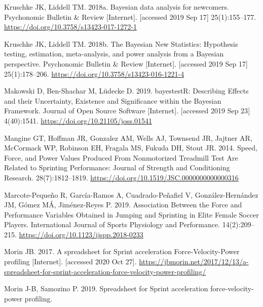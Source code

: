 \documentclass[
  letterpaper,
  DIV=11,
  numbers=noendperiod]{scrartcl}
\newlength{\cslhangindent}
\newlength{\cslentryspacingunit} %
\newenvironment{CSLReferences}[2] %
 {%
  \setlength{\parindent}{0pt}
  \ifodd #1
  \let\oldpar\par
  \def\par{\hangindent=\cslhangindent\oldpar}
  \fi
  \setlength{\parskip}{#2\cslentryspacingunit}
 }%
 {}
\begin{document}
\begin{CSLReferences}{0}{0}
\leavevmode{}%
Kruschke JK, Liddell TM. 2018a. Bayesian data analysis for newcomers.
Psychonomic Bulletin \& Review {[}Internet{]}. {[}accessed 2019 Sep
17{]} 25(1):155--177. \url{https://doi.org/10.3758/s13423-017-1272-1}

\leavevmode{}%
Kruschke JK, Liddell TM. 2018b. The {Bayesian New Statistics}:
{Hypothesis} testing, estimation, meta-analysis, and power analysis from
a {Bayesian} perspective. Psychonomic Bulletin \& Review {[}Internet{]}.
{[}accessed 2019 Sep 17{]} 25(1):178--206.
\url{https://doi.org/10.3758/s13423-016-1221-4}

\leavevmode{}%
Makowski D, Ben-Shachar M, Lüdecke D. 2019. {bayestestR}: {Describing
Effects} and their {Uncertainty}, {Existence} and {Significance} within
the {Bayesian Framework}. Journal of Open Source Software
{[}Internet{]}. {[}accessed 2019 Sep 23{]} 4(40):1541.
\url{https://doi.org/10.21105/joss.01541}

\leavevmode{}%
Mangine GT, Hoffman JR, Gonzalez AM, Wells AJ, Townsend JR, Jajtner AR,
McCormack WP, Robinson EH, Fragala MS, Fukuda DH, Stout JR. 2014. Speed,
{Force}, and {Power Values Produced From Nonmotorized Treadmill Test Are
Related} to {Sprinting Performance}: Journal of Strength and
Conditioning Research. 28(7):1812--1819.
\url{https://doi.org/10.1519/JSC.0000000000000316}

\leavevmode{}%
Marcote-Pequeño R, García-Ramos A, Cuadrado-Peñafiel V,
González-Hernández JM, Gómez MÁ, Jiménez-Reyes P. 2019. Association
{Between} the {Force} and {Performance
Variables Obtained} in {Jumping} and {Sprinting} in {Elite Female Soccer
Players}. International Journal of Sports Physiology and Performance.
14(2):209--215. \url{https://doi.org/10.1123/ijspp.2018-0233}

\leavevmode{}%
Morin JB. 2017. A spreadsheet for {Sprint} acceleration
{Force}-{Velocity}-{Power} profiling {[}Internet{]}. {[}accessed 2020
Oct 27{]}.
\url{https://jbmorin.net/2017/12/13/a-spreadsheet-for-sprint-acceleration-force-velocity-power-profiling/}

\leavevmode{}%
Morin J-B, Samozino P. 2019. Spreadsheet for {Sprint} acceleration
force-velocity-power profiling.


\end{CSLReferences}
\end{document}
